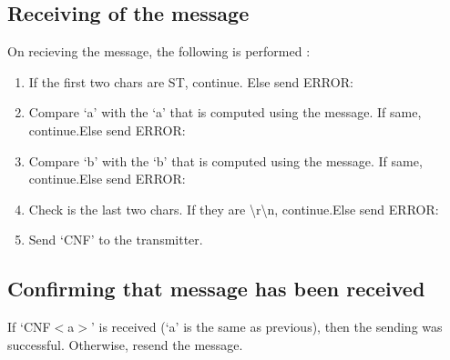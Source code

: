 \documentclass [a4paper,11pt]{article}
\begin{document}
\subsection{Receiving of the message}
On recieving the message, the following is performed :
\begin{enumerate}
\item If the first two chars are ST, continue. Else send ERROR:
\item Compare `a' with the `a' that is computed using the message. If same, continue.Else send ERROR:
\item Compare `b' with the `b' that is computed using the message. If same, continue.Else send ERROR:
\item Check is the last two chars. If they are {\textbackslash}r{\textbackslash}n, continue.Else send ERROR:
\item Send `CNF' to the transmitter.
\end{enumerate}
\subsection{Confirming that message has been received}
If `CNF$<$a$>$' is received (`a' is the same as previous), then the sending was successful. Otherwise, resend the message.
\end{document}
